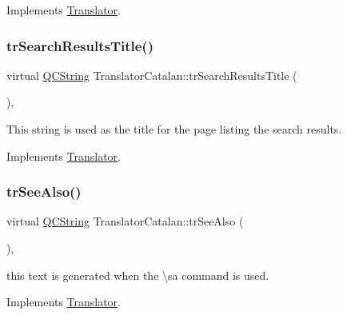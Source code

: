 Implements \mbox{\hyperlink{class_translator}{Translator}}.

\mbox{\label{class_translator_catalan_af2842c719664a8a118451e292c7db55c}} 
\subsubsection{\texorpdfstring{trSearchResultsTitle()}{trSearchResultsTitle()}}
{\footnotesize\ttfamily virtual \mbox{\hyperlink{class_q_c_string}{Q\+C\+String}} Translator\+Catalan\+::tr\+Search\+Results\+Title (\begin{DoxyParamCaption}{ }\end{DoxyParamCaption})\hspace{0.3cm}{\ttfamily [inline]}, {\ttfamily [virtual]}}

This string is used as the title for the page listing the search results. 

Implements \mbox{\hyperlink{class_translator}{Translator}}.

\mbox{\label{class_translator_catalan_a8a060e192473219bb6c53310e6dfea57}} 
\subsubsection{\texorpdfstring{trSeeAlso()}{trSeeAlso()}}
{\footnotesize\ttfamily virtual \mbox{\hyperlink{class_q_c_string}{Q\+C\+String}} Translator\+Catalan\+::tr\+See\+Also (\begin{DoxyParamCaption}{ }\end{DoxyParamCaption})\hspace{0.3cm}{\ttfamily [inline]}, {\ttfamily [virtual]}}

this text is generated when the \textbackslash{}sa command is used. 

Implements \mbox{\hyperlink{class_translator}{Translator}}.

\mbox{\label{class_translator_catalan_a4e54deda7038364912de14be91fd75a4}} 
